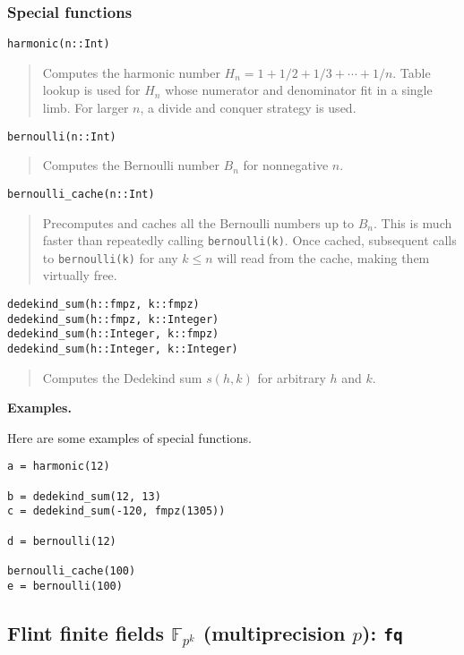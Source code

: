\documentclass[a4paper,10pt]{article}
\newcommand{\F}{\mathbb{F}}
\newcommand{\code}{\lstinline}
\newcommand{\desc}[1]{\vspace{-3mm}\begin{quote}#1\end{quote}}
\begin{document}
{{\subsubsection{Special functions}

\begin{lstlisting}
harmonic(n::Int)
\end{lstlisting}

\desc{Computes the harmonic number $H_n = 1 + 1/2 + 1/3 + \cdots + 1/n$.
Table lookup is used for $H_n$ whose numerator and denominator 
fit in a single limb. For larger $n$, a divide and conquer strategy is used.}

\begin{lstlisting}
bernoulli(n::Int)
\end{lstlisting}

\desc{Computes the Bernoulli number $B_n$ for nonnegative $n$.}

\begin{lstlisting}
bernoulli_cache(n::Int)
\end{lstlisting}

\desc{Precomputes and caches all the Bernoulli numbers up to $B_n$.
This is much faster than repeatedly calling \code{bernoulli(k)}.
Once cached, subsequent calls to \code{bernoulli(k)} for any $k \le n$
will read from the cache, making them virtually free.}

\begin{lstlisting}
dedekind_sum(h::fmpz, k::fmpz)
dedekind_sum(h::fmpz, k::Integer)
dedekind_sum(h::Integer, k::fmpz)
dedekind_sum(h::Integer, k::Integer)
\end{lstlisting}

\desc{Computes the Dedekind sum $s(h,k)$ for arbitrary $h$ and $k$.}

\textbf{Examples.}

Here are some examples of special functions.

\begin{lstlisting}
a = harmonic(12)

b = dedekind_sum(12, 13)
c = dedekind_sum(-120, fmpz(1305))

d = bernoulli(12)

bernoulli_cache(100)
e = bernoulli(100)
\end{lstlisting}

\subsection{Flint finite fields $\F_{p^k}$ (multiprecision $p$): \code|fq|}

}}
\end{document}
